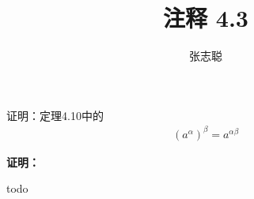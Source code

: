 \documentclass{article}
\begin{document}
\title{注释 4.3}
\author{张志聪}
\maketitle

\begin{zremark}
  证明：定理4.10中的
  \begin{align*}
    (a^\alpha)^\beta = a^{\alpha\beta}
  \end{align*}
\end{zremark}

\textbf{证明：}

todo
\end{document}
